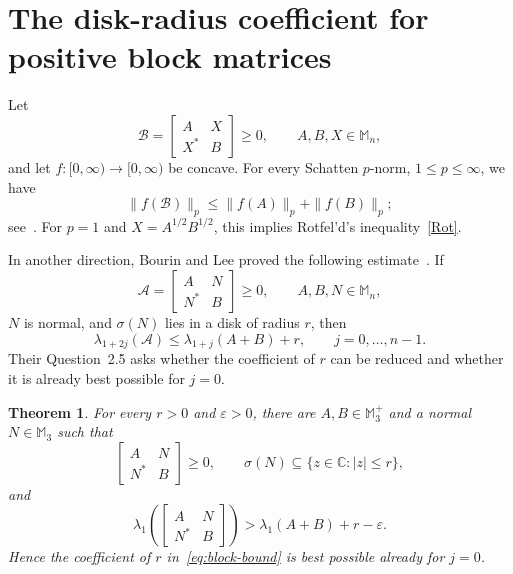 \documentclass[11pt]{amsart}
\numberwithin{equation}{section}
\newtheorem{theorem}{Theorem}[section]
\newcommand{\Mn}{\mathbb M_n}
\newcommand{\spec}{\sigma}
\begin{document}
\section{The disk-radius coefficient for positive block matrices}
\label{sec:block}

Let
\[
\mathcal B=\begin{bmatrix}A&X\\X^*&B\end{bmatrix}\geq0,
\qquad A,B,X\in\Mn,
\]
and let $f:[0,\infty)\to[0,\infty)$ be concave.
For every Schatten $p$-norm, $1\leq p\leq\infty$, we have
\[
\|f(\mathcal B)\|_p\leq\|f(A)\|_p+\|f(B)\|_p;
\]
see~\cite[Corollary~3.5]{BL12}.
For $p=1$ and $X=A^{1/2}B^{1/2}$, this implies
Rotfel'd's inequality~\eqref{Rot}. 

\begingroup

In another direction,
\endgroup
Bourin and Lee proved the following estimate~\cite[Corollary~2.4]{BourinLee2022}. If
\[
 \mathcal A=\begin{bmatrix}A&N\\N^*&B\end{bmatrix}\geq0,
 \qquad A,B,N\in\Mn,
\]
$N$ is normal, and $\spec(N)$ lies in a disk of radius $r$, then
\begin{equation}\label{eq:block-bound}
 \lambda_{1+2j}(\mathcal A)
 \leq\lambda_{1+j}(A+B)+r,
 \qquad j=0,\ldots,n-1.
\end{equation}
Their Question~2.5 asks whether the coefficient of $r$ can be reduced and whether it is already best possible for $j=0$.

\begin{theorem}\label{thm:radius-sharp}
For every $r>0$ and $\varepsilon>0$, there are $A,B\in\mathbb M_3^+$ and a normal $N\in\mathbb M_3$ such that
\[
 \begin{bmatrix}A&N\\N^*&B\end{bmatrix}\geq0,
 \qquad
 \spec(N)\subseteq\{z\in\mathbb C:|z|\leq r\},
\]
and
\begin{equation}\label{eq:radius-sharp}
 \lambda_1\!\left(\begin{bmatrix}A&N\\N^*&B\end{bmatrix}\right)
 >\lambda_1(A+B)+r-\varepsilon.
\end{equation}
Hence the coefficient of $r$ in~\eqref{eq:block-bound} is best possible already for $j=0$.
\end{theorem}
\end{document}
